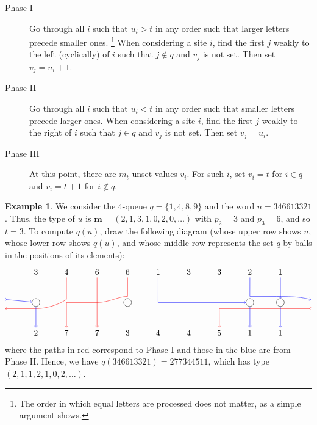 \documentclass[submission]{FPSAC2018}
\newcommand{\mm}{\mathbf{m}}
\theoremstyle{plain}
\theoremstyle{definition}
\newtheorem{example}[thm]{Example}
\numberwithin{equation}{section}
\begin{document}
\begin{description}
\item[Phase I]
  Go through all $i$ such that $u_i > t$ in any order such that larger letters precede smaller ones.%
  \footnote{The order in which equal letters are processed does not matter, as a simple argument shows.}
  When considering a site $i$, find the first $j$ weakly to the left (cyclically) of $i$ such that $j \notin q$ and $v_j$ is not set.
  Then set $v_j = u_i + 1$.

\item[Phase II]
  Go through all $i$ such that $u_i < t$ in any order such that smaller letters precede larger ones.
  When considering a site $i$, find the first $j$ weakly to the right of $i$ such that $j \in q$ and $v_j$ is not set.
  Then set $v_j = u_i$.

\item[Phase III]
  At this point, there are $m_t$ unset values $v_i$. For such $i$, set $v_i = t$ for $i \in q$ and $v_i = t+1$ for $i\notin q$.
\end{description}

\begin{example}
\label{ex:first_queue}
We consider the $4$-queue $q = \{1, 4, 8, 9\}$ and the word $u = 346613321$.
Thus, the type of $u$ is $\mm = (2, 1, 3, 1, 0, 2, 0, \ldots)$ with $p_2 = 3$ and $p_3 = 6$, and so $t = 3$.
To compute $q(u)$, draw the following diagram
(whose upper row shows $u$, whose lower row shows $q(u)$,
and whose middle row represents the set $q$ by balls in the positions of its elements):
\[
\begin{tikzpicture}[scale=1.3,baseline=0]
\node (i1) at (1,1) {$3$};
\node (i2) at (2,1) {$4$};
\node (i3) at (3,1) {$6$};
\node (i4) at (4,1) {$6$};
\node (i5) at (5,1) {$1$};
\node (i6) at (6,1) {$3$};
\node (i7) at (7,1) {$3$};
\node (i8) at (8,1) {$2$};
\node (i9) at (9,1) {$1$};
\node (t1) at (1,-1) {$2$};
\node (t2) at (2,-1) {$7$};
\node (t3) at (3,-1) {$7$};
\node (t4) at (4,-1) {$3$};
\node (t5) at (5,-1) {$4$};
\node (t6) at (6,-1) {$4$};
\node (t7) at (7,-1) {$5$};
\node (t8) at (8,-1) {$1$};
\node (t9) at (9,-1) {$1$};
\node[circle,draw=black] (q1) at (1,0) {};
\node[circle,draw=black] (q2) at (4,0) {};
\node[circle,draw=black] (q3) at (8,0) {};
\node[circle,draw=black] (q4) at (9,0) {};
\draw[->,red] (i4) -- (4,0.2) .. controls (3.7,0.2) and (3.4,0) .. (3,0) -- (2,0) -- (t2);
\draw[->,red] (i3) -- (t3);
\draw[->,red] (i2) -- (2,0.1) .. controls (1.7,-0.1) and (1.3,-0.2) .. (1,-0.2) -- (0,-0.2);
\draw[>->,red] (10,-0.2) -- (8,-0.2) -- (7,-0.2) -- (t7);
\draw[->,blue] (i5) -- (5,0) -- (q3);
\draw[->,blue] (q3) -- (t8);
\draw[->,blue] (i9) -- (q4);
\draw[->,blue] (q4) -- (t9);
\draw[->,blue] (i8) -- (8,0.2) .. controls (9.5,0.2) .. (10,0.1);
\draw[>->,blue] (0,0.1) -- (q1);
\draw[->,blue] (q1) -- (t1);
\end{tikzpicture}
\]
where the paths in red correspond to Phase I and those in the blue are from Phase II. Hence, we have $q(346613321) = 277344511$, which has type $(2,1,1,2,1,0,2,\ldots)$.
\end{example}
\end{document}
